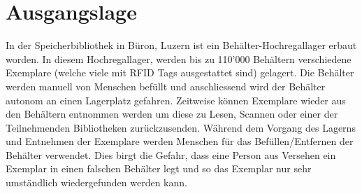 \chapter{Ausgangslage}
In der Speicherbibliothek in Büron, Luzern ist ein Behälter-Hochregallager erbaut worden. In diesem Hochregallager, werden bis zu 110'000 Behältern verschiedene Exemplare (welche viele mit RFID Tags ausgestattet sind) gelagert. Die Behälter werden manuell von Menschen befüllt und anschliessend wird der Behälter autonom an einen Lagerplatz gefahren. Zeitweise können Exemplare wieder aus den Behältern entnommen werden um diese zu Lesen, Scannen oder einer der Teilnehmenden Bibliotheken zurückzusenden. Während dem Vorgang des Lagerns und Entnehmen der Exemplare werden Menschen für das Befüllen/Entfernen der Behälter verwendet. Dies birgt die Gefahr, dass eine Person aus Versehen ein Exemplar in einen falschen Behälter legt und so das Exemplar nur sehr umständlich wiedergefunden werden kann.